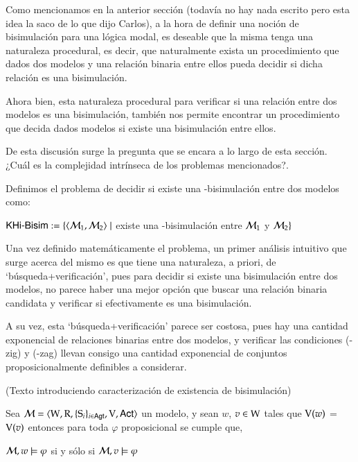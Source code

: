 Como mencionamos en la anterior sección (todavía no hay nada escrito pero esta idea la saco de lo que dijo Carlos),
a la hora de definir una noción de bisimulación para una lógica modal, es deseable que la misma
tenga una naturaleza procedural, es decir, que naturalmente exista un procedimiento que dados dos
modelos y una relación binaria entre ellos pueda decidir si dicha relación es una bisimulación.

Ahora bien, esta naturaleza procedural para verificar si una relación entre dos modelos es una bisimulación,
también nos permite encontrar un procedimiento que decida dados modelos si existe una bisimulación entre ellos.

De esta discusión surge la pregunta que se encara a lo largo de esta sección. ¿Cuál es la complejidad
intrínseca de los problemas mencionados?.

\begin{definicion}
    Definimos el problema de decidir si existe una \KHilogic-bisimulación entre dos modelos como:
    \begin{center}
        $\rm\textsf{KHi-Bisim} := \{\langle \mathcal{M}_1,\mathcal{M}_2 \rangle \mid$ existe una \KHilogic-bisimulación
        entre $\mathcal{M}_1$ y $\mathcal{M}_2\}$
    \end{center}
\end{definicion}

Una vez definido matemáticamente el problema, un primer análisis intuitivo que surge acerca
del mismo es que tiene una naturaleza, a priori, de `búsqueda+verificación', pues
para decidir si existe una bisimulación entre dos modelos, no parece haber una mejor
opción que buscar una relación binaria candidata y verificar si efectivamente es una bisimulación. 

A su vez, esta `búsqueda+verificación' parece ser costosa, pues hay una cantidad exponencial de relaciones binarias
entre dos modelos, y verificar las condiciones (\KHilogic-zig) y (\KHilogic-zag) llevan consigo una cantidad exponencial
de conjuntos proposicionalmente definibles a considerar.

(Texto introduciendo caracterización de existencia de bisimulación)

\begin{lema}
    Sea $\mathcal{M}=\langle \mathrm{W},\mathrm{R},\{ \mathrm{S}_i \}_{i \in {\rm \sf Agt}},\mathrm{V},{\rm \sf Act} \rangle$ un modelo, y sean $w$, $v \in \mathrm{W}$
    tales que $\mathrm{V}(w)$ = $\mathrm{V}(v)$ entonces para toda $\varphi$ proposicional se cumple que, 
    \begin{center}
    $\mathcal{M}, w \models \varphi$ \quad si y sólo si \quad $ 
    \mathcal{M}, v \models \varphi$
    \end{center}
\end{lema}

